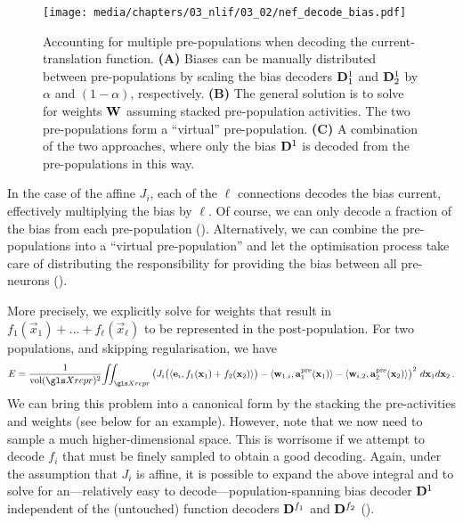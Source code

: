 \begin{figure}
	\texttt{[image: media/chapters/03\_nlif/03\_02/nef\_decode\_bias.pdf]}%
	{\label{fig:nef_decode_bias_a}}%
	{\label{fig:nef_decode_bias_b}}%
	{\label{fig:nef_decode_bias_c}}%
	\caption[Accounting for multiple pre-populations when decoding the current-translation function]{Accounting for multiple pre-populations when decoding the current-translation function. \textbf{(A)} Biases can be manually distributed between pre-populations by scaling the bias decoders $\mathbf{D}^1_1$ and $\mathbf{D}^1_2$ by $\alpha$ and $(1 - \alpha)$, respectively. \textbf{(B)} The general solution is to solve for weights $\mathbf{W}$ assuming stacked pre-population activities. The two pre-populations form a \enquote{virtual} pre-population. \textbf{(C)} A combination of the two approaches, where only the bias $\mathbf{D}^1$ is decoded from the pre-populations in this way.}
\end{figure}

In the case of the affine $J_i$, each of the $\ell$ connections decodes the bias current, effectively multiplying the bias by $\ell$.
Of course, we can only decode a fraction of the bias from each pre-population ().
Alternatively, we can combine the pre-populations into a \enquote{virtual pre-population} and let the optimisation process take care of distributing the responsibility for providing the bias between all pre-neurons ().

More precisely, we explicitly solve for weights that result in $f_1(\vec x_1) + \ldots + f_\ell(\vec x_\ell)$ to be represented in the post-population.
For two populations, and skipping regularisation, we have
\begin{align}
	E =
	\frac{1}{\vol(\Xrepr)^2} \! \iint_{\Xrepr}
	\left(
		J_i\bigl(\langle \vec e_i, f_1(\vec x_1) + f_2(\vec x_2) \rangle\bigr)
		- \langle \vec w_{1, i}, \vec a_1^\mathrm{pre}(\vec x_1) \rangle
		- \langle \vec w_{i, 2}, \vec a_2^\mathrm{pre}(\vec x_2) \rangle
	\right)^2 \, d\vec x_1 d\vec x_2 \,.
	\label{eqn:decode_current_additive}
\end{align}
We can bring this problem into a canonical form by the stacking the pre-activities and weights (see below for an example).
However, note that we now need to sample a much higher-dimensional space.
This is worrisome if we attempt to decode $f_i$ that must be finely sampled to obtain a good decoding.
Again, under the assumption that $J_i$ is affine, it is possible to expand the above integral and to solve for an---relatively easy to decode---population-spanning bias decoder $\mathbf{D}^1$ independent of the (untouched) function decoders $\mathbf{D}^{f_1}$ and $\mathbf{D}^{f_2}$ ().

